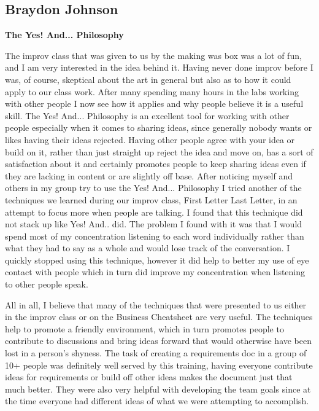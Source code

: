 \documentclass[12pt,letterpaper]{article}
\begin{document}
\subsection{Braydon Johnson}
\textbf{The Yes! And... Philosophy}\par
The improv class that was given to us by the making was box was a lot of fun, and I am very interested in the idea behind it. Having never done improv before I was, of course, skeptical about the art in general but also as to how it could apply to our class work. After many spending many hours in the labs working with other people I now see how it applies and why people believe it is a useful skill. The Yes! And... Philosophy is an excellent tool for working with other people especially when it comes to sharing ideas, since generally nobody wants or likes having their ideas rejected. Having other people agree with your idea or build on it, rather than just straight up reject the idea and move on, has a sort of satisfaction about it and certainly promotes people to keep sharing ideas even if they are lacking in content or are slightly off base. After noticing myself and others in my group try to use the Yes! And... Philosophy I tried another of the techniques we learned during our improv class, First Letter Last Letter, in an attempt to focus more when people are talking. I found that this technique did not stack up like Yes! And.. did. The problem I found with it was that I would spend most of my concentration listening to each word individually rather than what they had to say as a whole and would lose track of the conversation. I quickly stopped using this technique, however it did help to better my use of eye contact with people which in turn did improve my concentration when listening to other people speak.\par
	All in all, I believe that many of the techniques that were presented to us either in the improv class or on the Business Cheatsheet are very useful. The techniques help to promote a friendly environment, which in turn promotes people to contribute to discussions and bring ideas forward that would otherwise have been lost in a person’s shyness. The task of creating a requirements doc in a group of 10+ people was definitely well served by this training, having everyone contribute ideas for requirements or build off other ideas makes the document just that much better. They were also very helpful with developing the team goals since at the time everyone had different ideas of what we were attempting to accomplish.
\end{document}
